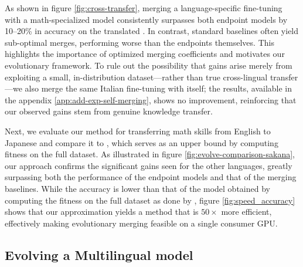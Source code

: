 As shown in figure \ref{fig:cross-transfer}, merging a language-specific fine-tuning with a math-specialized model consistently surpasses both endpoint models by 10–20\% in accuracy on the translated . In contrast, standard baselines often yield sub-optimal merges, performing worse than the endpoints themselves. This highlights the importance of optimized merging coefficients and motivates our evolutionary framework. To rule out the possibility that gains arise merely from exploiting a small, in-distribution dataset—rather than true cross-lingual transfer—we also merge the same Italian fine-tuning with itself; the results, available in the appendix \ref{app:add-exp-self-merging}, shows no improvement, reinforcing that our observed gains stem from genuine knowledge transfer.

Next, we evaluate our method for transferring math skills from English to Japanese and compare it to  \citep{sakana}, which serves as an upper bound by computing fitness on the full dataset. As illustrated in figure \ref{fig:evolve-comparison-sakana}, our approach confirms the significant gains seen for the other languages, greatly surpassing both the performance of the endpoint models and that of the merging baselines.
While the accuracy is lower than that of the model obtained by computing the fitness on the full dataset as done by \citet{sakana}, figure \ref{fig:speed_accuracy} shows that our approximation yields a method that is $50\times$ more efficient, effectively making evolutionary merging feasible on a single consumer GPU.

\subsection{Evolving a Multilingual model}
\label{sec: multi-lingual}

